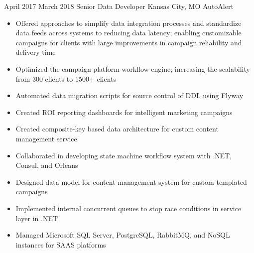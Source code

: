 \Experience
{April 2017}
{March 2018}
{Senior Data Developer}
{Kansas City, MO}
{AutoAlert}
{
    \begin{itemize}
        \item Offered approaches to simplify data integration processes and
        standardize data feeds across systems to reducing data latency; enabling
        customizable campaigns for clients with large improvements in campaign
        reliability and delivery time
        \item Optimized the campaign platform workflow engine; increasing the
        scalability from 300 clients to 1500+ clients
        \item Automated data migration scripts for source control of DDL using
        Flyway
        \item Created ROI reporting dashboards for intelligent marketing
        campaigns
        \item Created composite-key based data architecture for custom content
        management service
        \item Collaborated in developing state machine workflow system with
        .NET, Consul, and Orleans
        \item Designed data model for content management system for custom
        templated campaigns
        \item Implemented internal concurrent queues to stop race conditions in
        service layer in .NET
        \item Managed Microsoft SQL Server, PostgreSQL, RabbitMQ, and NoSQL
        instances for SAAS platforms
    \end{itemize}
}

\vspace*{0.05 in}

